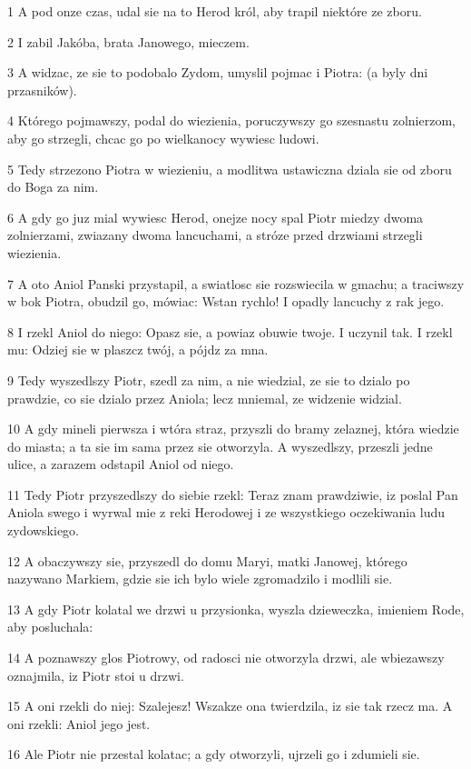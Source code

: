 \par 1 A pod onze czas, udal sie na to Herod król, aby trapil niektóre ze zboru.
\par 2 I zabil Jakóba, brata Janowego, mieczem.
\par 3 A widzac, ze sie to podobalo Zydom, umyslil pojmac i Piotra: (a byly dni przasników).
\par 4 Którego pojmawszy, podal do wiezienia, poruczywszy go szesnastu zolnierzom, aby go strzegli, chcac go po wielkanocy wywiesc ludowi.
\par 5 Tedy strzezono Piotra w wiezieniu, a modlitwa ustawiczna dziala sie od zboru do Boga za nim.
\par 6 A gdy go juz mial wywiesc Herod, onejze nocy spal Piotr miedzy dwoma zolnierzami, zwiazany dwoma lancuchami, a stróze przed drzwiami strzegli wiezienia.
\par 7 A oto Aniol Panski przystapil, a swiatlosc sie rozswiecila w gmachu; a traciwszy w bok Piotra, obudzil go, mówiac: Wstan rychlo! I opadly lancuchy z rak jego.
\par 8 I rzekl Aniol do niego: Opasz sie, a powiaz obuwie twoje. I uczynil tak. I rzekl mu: Odziej sie w plaszcz twój, a pójdz za mna.
\par 9 Tedy wyszedlszy Piotr, szedl za nim, a nie wiedzial, ze sie to dzialo po prawdzie, co sie dzialo przez Aniola; lecz mniemal, ze widzenie widzial.
\par 10 A gdy mineli pierwsza i wtóra straz, przyszli do bramy zelaznej, która wiedzie do miasta; a ta sie im sama przez sie otworzyla. A wyszedlszy, przeszli jedne ulice, a zarazem odstapil Aniol od niego.
\par 11 Tedy Piotr przyszedlszy do siebie rzekl: Teraz znam prawdziwie, iz poslal Pan Aniola swego i wyrwal mie z reki Herodowej i ze wszystkiego oczekiwania ludu zydowskiego.
\par 12 A obaczywszy sie, przyszedl do domu Maryi, matki Janowej, którego nazywano Markiem, gdzie sie ich bylo wiele zgromadzilo i modlili sie.
\par 13 A gdy Piotr kolatal we drzwi u przysionka, wyszla dzieweczka, imieniem Rode, aby posluchala:
\par 14 A poznawszy glos Piotrowy, od radosci nie otworzyla drzwi, ale wbiezawszy oznajmila, iz Piotr stoi u drzwi.
\par 15 A oni rzekli do niej: Szalejesz! Wszakze ona twierdzila, iz sie tak rzecz ma. A oni rzekli: Aniol jego jest.
\par 16 Ale Piotr nie przestal kolatac; a gdy otworzyli, ujrzeli go i zdumieli sie.
